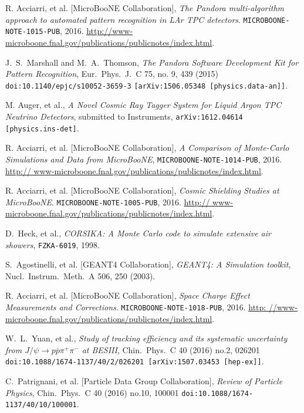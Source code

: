 \documentclass[a4paper]{scrartcl}
\begin{document}
\begin{thebibliography}{9}

   R. Acciarri, et al. [MicroBooNE Collaboration], \textit{The Pandora multi-algorithm approach to automated pattern recognition in LAr TPC detectors}. \texttt{MICROBOONE- NOTE-1015-PUB}, 2016. \url{http://www-microboone.fnal.gov/publications/publicnotes/index.html}.

   J.~S.~Marshall and M.~A.~Thomson, \textit{The Pandora Software Development Kit for Pattern Recognition}, Eur.\ Phys.\ J.\ C 75, no. 9, 439 (2015) \texttt{doi:10.1140/epjc/s10052-3659-3} \texttt{[arXiv:1506.05348 [physics.data-an]]}.

   M. Auger, et al., \textit{A Novel Cosmic Ray Tagger System for Liquid Argon TPC Neutrino Detectors}, submitted to Instruments, \texttt{arXiv:1612.04614 [physics.ins-det]}.

   R. Acciarri, et al. [MicroBooNE Collaboration], \textit{A Comparison of Monte-Carlo Simulations and Data from MicroBooNE}, \texttt{MICROBOONE-NOTE-1014-PUB}, 2016. \url{http:// www-microboone.fnal.gov/publications/publicnotes/index.html}.

   R. Acciarri, et al. [MicroBooNE Collaboration], \textit{Cosmic Shielding Studies at MicroBooNE}. \texttt{MICROBOONE-NOTE-1005-PUB}, 2016. \url{http:// www-microboone.fnal.gov/publications/publicnotes/index.html}.

   D.~Heck, et al.,
  \textit{CORSIKA: A Monte Carlo code to simulate extensive air showers},
  \texttt{FZKA-6019}, 1998.

   S.~Agostinelli, et al. [GEANT4 Collaboration], \textit{GEANT4: A Simulation toolkit}, Nucl.\ Instrum.\ Meth.\ A {506}, 250 (2003).

   R. Acciarri, et al. [MicroBooNE Collaboration], \textit{Space Charge Effect Measurements and Corrections}. \texttt{MICROBOONE-NOTE-1018-PUB}, 2016. \url{http: //www-microboone.fnal.gov/publications/publicnotes/index.html}.

   W.~L.~Yuan, et al., \textit{Study of tracking efficiency and its systematic uncertainty from $J/\psi \to p \overline{p} \pi^+ \pi^-$ at BESIII}, Chin.\ Phys.\ C 40 (2016) no.2,  026201 \texttt{doi:10.1088/1674-1137/40/2/026201 [arXiv:1507.03453 [hep-ex]]}.

   C.~Patrignani, et al. [Particle Data Group Collaboration], \textit{Review of Particle Physics}, Chin.\ Phys.\ C 40 (2016) no.10,  100001 \texttt{doi:10.1088/1674-1137/40/10/100001}.


\end{thebibliography}
\end{document}
